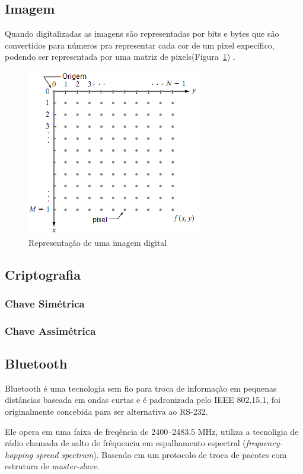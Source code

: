 \documentclass[12pt]{article}
\begin{document}
\subsection{Imagem}
Quando digitalizadas as imagens são representadas por bits e bytes que são convertidos para números pra representar cada cor de um pixel expecífico, podendo ser representada por uma matriz de pixels(Figura~\ref{fig:exampleFig1}) .  

\begin{figure}[ht]
\centering
\includegraphics[width=.4\textwidth]{images/image.png}
\caption{Representação de uma imagem digital}
\label{fig:exampleFig1}
\end{figure}

\subsection{Criptografia}
\subsubsection{Chave Simétrica}

\subsubsection{Chave Assimétrica}
\subsection{Bluetooth}
Bluetooth é uma tecnologia sem fio para troca de informação em pequenas distâncias baseada em ondas curtas e é padronizada pelo IEEE 802.15.1, foi originalmente concebida para ser alternativa ao RS-232. 

Ele opera em uma faixa de freqência de 2400–2483.5 MHz, utiliza a tecnoligia de rádio chamada de salto de frêquencia em espalhamento espectral (\textit{frequency-hopping spread spectrum}). Baseado em um protocolo de troca de pacotes com estrutura de \textit{master-slave}.
\end{document}
